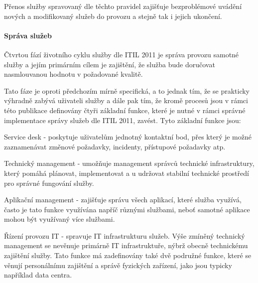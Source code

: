 \documentclass[
  digital,     %
  twoside,     %
  lof,         %
  lot,         %
]{fithesis4}
\begin{document}
Přenos služby spravovaný dle těchto pravidel zajišťuje bezproblémové uvádění nových a modifikovaný služeb do provozu a stejně tak i jejich ukončení. 
\paragraph{Správa služeb}
Čtvrtou fází životního cyklu služby dle ITIL 2011 je správa provozu samotné služby a jejím primárním cílem je zajištění, že služba bude doručovat nasmlouvanou hodnotu v požadované kvalitě.\parencite[s.~36]{Matula2017}

Tato fáze je oproti předchozím mírně specifická, a to jednak tím, že se prakticky výhradně zabývá uživateli služby a dále pak tím, že kromě procesů jsou v rámci této publikace definovány čtyři základní funkce, které je nutné v rámci správné implementace správy služeb dle ITIL 2011, zavést. Tyto základní funkce jsou: \parencite[s.~46]{Carlidge2007}
\begin{compactitem}
    \item Service desk - poskytuje uživatelům jednotný kontaktní bod, přes který je možné zaznamenávat změnové požadavky, incidenty, přístupové požadavky atp. 
    \item Technický management - umožňuje management správců technické infrastruktury, který pomáhá plánovat, implementovat a u udržovat stabilní technické prostředí pro správné fungování služby.
    \item Aplikační management - zajišťuje správu všech aplikací, které služba využívá, často je tato funkce využívána napříč různými službami, neboť samotné aplikace mohou být využívaný více službami.
    \item Řízení provozu IT - spravuje IT infrastrukturu služeb. Výše zmíněný technický management se nevěnuje primárně IT infrastruktuře, nýbrž obecně technickému zajištění služby. Tato funkce má zadefinovány také dvě podružné funkce, které se věnují personálnímu zajištění a správě fyzických zařízení, jako jsou typicky například data centra.
\end{compactitem}
\end{document}
